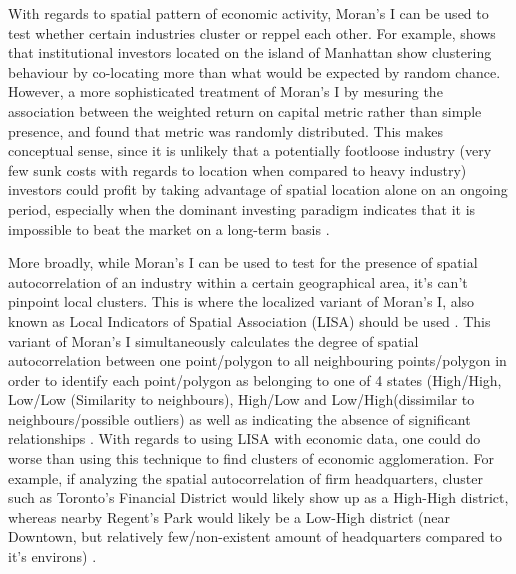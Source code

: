 \documentclass[12pt,letterpaper,notitlepage,onecolumn,final,openbib]{article}
\begin{document}
With regards to spatial pattern of economic activity, Moran's I can be used to test whether certain industries cluster or reppel each other.  For example,  shows that institutional investors located on the island of Manhattan show clustering behaviour by co-locating more than what would be expected by random chance.  However, a more sophisticated treatment of Moran's I by mesuring the association between the weighted return on capital metric rather than simple presence, and found that metric was randomly distributed.  This makes conceptual sense, since it is unlikely that a potentially footloose industry (very few sunk costs with regards to location when compared to heavy industry)  investors could profit by taking advantage of spatial location alone on an ongoing period, especially when the dominant investing paradigm indicates that it is impossible to beat the market on a long-term basis \cite{Malkiel2005}.  

More broadly, while Moran's I can be used to test for the presence of spatial autocorrelation of an industry within a certain geographical area, it's can't pinpoint local clusters.  This is where the localized variant of Moran's I, also known as Local Indicators of Spatial Association (LISA) should be used \cite{anselin1995local}.  This variant of Moran's I simultaneously calculates the degree of spatial autocorrelation between one point/polygon to all neighbouring points/polygon in order to identify each point/polygon as belonging to one of 4 states (High/High, Low/Low (Similarity to neighbours), High/Low and Low/High(dissimilar to neighbours/possible outliers) as well as indicating the absence of significant relationships \cite{Anselin2003}.  With regards to using LISA with economic data, one could do worse than using this technique to find clusters of economic agglomeration.  For example, if analyzing the spatial autocorrelation of firm headquarters, cluster such as Toronto's Financial District would likely show up as a High-High district, whereas nearby Regent's Park would likely be a Low-High district (near Downtown, but relatively few/non-existent amount of headquarters compared to it's environs) . 



	\pagebreak
	
	
\end{document}
